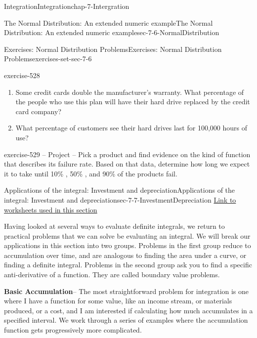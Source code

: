 \documentclass[oneside,10pt,]{book}
\newcommand{\terminology}[1]{\textbf{#1}}
\numberwithin{equation}{section}
\begin{document}
\begin{chapterptx}{Integration}{}{Integration}{}{}{chap-7-Intergration}
\begin{sectionptx}{The Normal Distribution: An extended numeric example}{}{The Normal Distribution: An extended numeric example}{}{}{sec-7-6-NormalDistribution}
\begin{exercises-subsection-numberless}{Exercises: Normal Distribution Problems}{}{Exercises: Normal Distribution Problems}{}{}{exercises-set-sec-7-6}
\begin{divisionexercise}{12}{}{}{exercise-528}
\begin{enumerate}[label=(\alph*)]
\item\hypertarget{li-794}{}\hypertarget{p-3000}{}%
Some credit cards double the manufacturer’s warranty.  What percentage of the people who use this plan will have their hard drive replaced by the credit card company?%
\item\hypertarget{li-795}{}\hypertarget{p-3001}{}%
What percentage of customers see their hard drives last for 100,000 hours of use?%
\end{enumerate}
\end{divisionexercise}%
\begin{divisionexercise}{13}{}{}{exercise-529}%
\hypertarget{p-3002}{}%
– Project – Pick a product and find evidence on the kind of function that describes its failure rate.  Based on that data, determine how long we expect it to take until 10\% , 50\% , and 90\%  of the products fail.%
\end{divisionexercise}%
\end{exercises-subsection-numberless}
\end{sectionptx}
%
%
\typeout{************************************************}
\typeout{************************************************}
%
\begin{sectionptx}{Applications of the integral: Investment and depreciation}{}{Applications of the integral: Investment and depreciation}{}{}{sec-7-7-InvestmentDepreciation}
\hypertarget{p-3003}{}%
\href{./Examples/Section-7-7-Examples.xlsx}{Link to worksheets used in this section}%
\par
\hypertarget{p-3004}{}%
Having looked at several ways to evaluate definite integrals, we return to practical problems that we can solve be evaluating an integral.  We will break our applications in this section into two groups.  Problems in the first group reduce to accumulation over time, and are analogous to finding the area under a curve, or finding a definite integral.  Problems in the second group ask you to find a specific anti-derivative of a function.  They are called boundary value problems.%
\par
\hypertarget{p-3005}{}%
\terminology{Basic Accumulation}– The most straightforward problem for integration is one where I have a function for some value, like an income stream, or materials produced, or a cost, and I am interested if calculating how much accumulates in a specified interval.  We work through a series of examples where the accumulation function gets progressively more complicated.%

\end{sectionptx}
\end{chapterptx}
\end{document}
